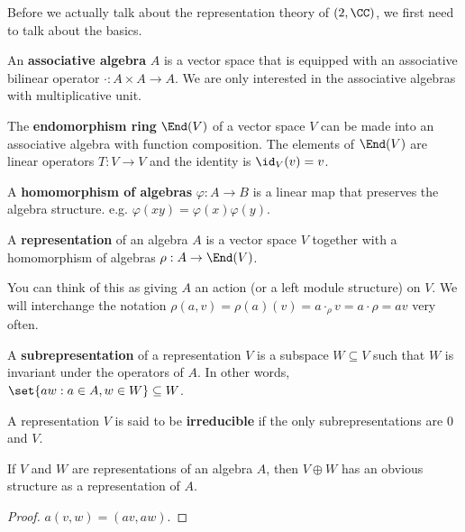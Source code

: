 \documentclass{article}
\begin{document}
Before we actually talk about the representation theory of $\sl(2, \CC)$, we
first need to talk about the basics.

\begin{df}
An \textbf{associative algebra} $A$ is a vector space that is equipped with an
associative bilinear operator $\cdot : A \times A \to A$. We are only interested
in the associative algebras with multiplicative unit.
\end{df}

\begin{ex}
The \textbf{endomorphism ring} $\End(V)$ of a vector space $V$ can be made into
an associative algebra with function composition. The elements of $\End(V)$ are
linear operators $T : V \to V$ and the identity is $\id_V(v) = v$.
\end{ex}

\begin{df}
A \textbf{homomorphism of algebras} $\varphi : A \to B$ is a linear map that
preserves the algebra structure. e.g. $\varphi(xy) = \varphi(x) \varphi(y)$.
\end{df}

\begin{df}
A \textbf{representation} of an algebra $A$ is a vector space $V$ together with
a homomorphism of algebras $\rho : A \to \End(V)$.

You can think of this as giving $A$ an action (or a left module structure) on
$V$. We will interchange the notation $\rho(a, v) = \rho(a)(v) = a \cdot_{\rho}
v = a \cdot \rho = av$ very often.
\end{df}

\begin{df}
A \textbf{subrepresentation} of a representation $V$ is a subspace $W \subseteq
V$ such that $W$ is invariant under the operators of $A$. In other words,
$\set{aw : a \in A, w \in W} \subseteq W$.
\end{df}

\begin{df}
A representation $V$ is said to be \textbf{irreducible} if the only
subrepresentations are $0$ and $V$.
\end{df}

\begin{prop}
If $V$ and $W$ are representations of an algebra $A$, then $V \oplus W$ has an
obvious structure as a representation of $A$.
\end{prop}

\begin{proof}
$a (v, w) = (av, aw)$.
\end{proof}
\end{document}
